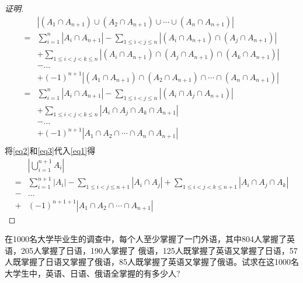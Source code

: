 \begin{proof}[证明]
  \begin{equation}\label{eq3}
    \begin{split}
      &|(A_1 \cap A_{n+1}) \cup (A_2 \cap A_{n+1}) \cup \cdots \cup (A_n \cap A_{n+1})|\\
      =&\sum_{i=1}^n|A_i \cap A_{n+1}| - \sum_{1\leq i < j \leq n}|(A_i \cap A_{n+1}) \cap (A_j \cap A_{n+1}) |\\
      &+ \sum_{1 \leq  i < j < k \leq n}|(A_i \cap A_{n+1}) \cap (A_j \cap A_{n+1}) \cap (A_k \cap A_{n+1})|\\
&-\ldots\\
&+(-1)^{n+1}|(A_1 \cap A_{n+1}) \cap (A_2 \cap A_{n+1}) \cap \cdots \cap (A_n \cap A_{n+1})| \\
      =&\sum_{i=1}^n|A_i \cap A_{n+1}| - \sum_{1\leq i < j \leq n}|(A_i  \cap A_j \cap A_{n+1}) |\\
      &+ \sum_{1 \leq  i < j < k \leq n}|A_i  \cap A_j  \cap A_k \cap A_{n+1}|\\
&-\ldots\\
&+(-1)^{n+1}|A_1  \cap A_2  \cap \cdots \cap A_n \cap A_{n+1}| \\
    \end{split}
  \end{equation}
    将\eqref{eq2}和\eqref{eq3}代入\eqref{eq1}得
  \begin{equation*}
    \begin{split}
    &|\bigcup_{i=1}^{n+1}A_i|\\
=&\sum_{i=1}^{n+1}|A_i| - \sum_{1\leq i < j \leq {n+1}}|A_i \cap A_j| + \sum_{1 \leq  i < j < k \leq {n+1}}|A_i \cap A_j \cap A_k|\\
-&\ldots\\
+&(-1)^{n+1+1}|A_1 \cap A_2 \cap \cdots \cap A_{n+1}|
\end{split}
\end{equation*}


\end{proof}
\begin{Example}
  在1000名大学毕业生的调查中，每个人至少掌握了一门外语，其中804人掌握了英语，205人掌握了日语，190人掌握了 俄语，125人既掌握了英语又掌握了日语，57人既掌握了日语又掌握了俄语，85人既掌握了英语又掌握了俄语。试求在这1000名大学生中，英语、日语、俄语全掌握的有多少人?
\end{Example}

